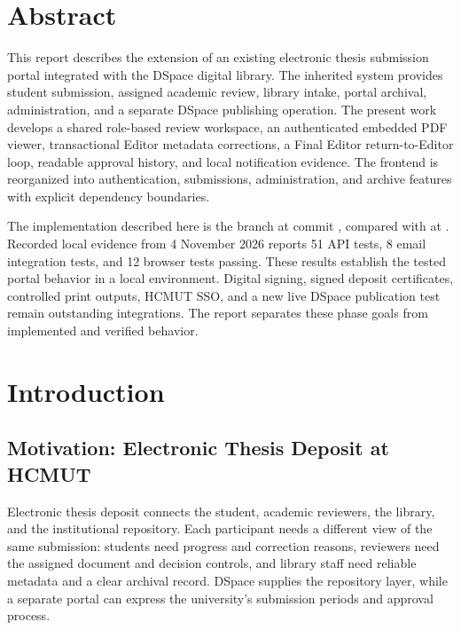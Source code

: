 \documentclass[11pt,a4paper]{report}
\newcommand{\code}[1]{{\small\texttt{\detokenize{#1}}}}
\begin{document}
\chapter*{Abstract}
This report describes the extension of an existing electronic thesis submission portal integrated with the DSpace digital library. The inherited system provides student submission, assigned academic review, library intake, portal archival, administration, and a separate DSpace publishing operation. The present work develops a shared role-based review workspace, an authenticated embedded PDF viewer, transactional Editor metadata corrections, a Final Editor return-to-Editor loop, readable approval history, and local notification evidence. The frontend is reorganized into authentication, submissions, administration, and archive features with explicit dependency boundaries.

The implementation described here is the \code{UI-build} branch at commit \code{3d97faf3}, compared with \code{main} at \code{4f7a73df}. Recorded local evidence from 4 November 2026 reports 51 API tests, 8 email integration tests, and 12 browser tests passing. These results establish the tested portal behavior in a local environment. Digital signing, signed deposit certificates, controlled print outputs, HCMUT SSO, and a new live DSpace publication test remain outstanding integrations. The report separates these phase goals from implemented and verified behavior.
\clearpage
\tableofcontents
\clearpage
\listoffigures
\listoftables
\clearpage
{}


\chapter{Introduction}
\label{ch:introduction}

\section{Motivation: Electronic Thesis Deposit at HCMUT}
Electronic thesis deposit connects the student, academic reviewers, the library, and the institutional repository. Each participant needs a different view of the same submission: students need progress and correction reasons, reviewers need the assigned document and decision controls, and library staff need reliable metadata and a clear archival record. DSpace supplies the repository layer, while a separate portal can express the university's submission periods and approval process.
\end{document}
